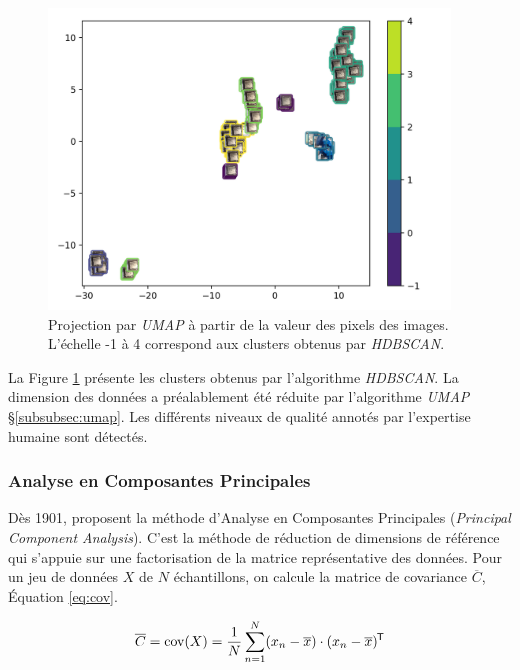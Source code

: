 \begin{figure}[hbtp]
	\centering
	\includegraphics[width=0.95\textwidth,height=\textheight,keepaspectratio]{../Chap4/Figures/visualize_HDBSCAN_clusters_pixel_space.png}
	\caption{Projection par \textit{UMAP} à partir de la valeur des pixels des images. L'échelle -1 à 4 correspond aux clusters obtenus par \textit{HDBSCAN}.}
	\label{fig:hdbscan}
\end{figure}

La Figure \ref{fig:hdbscan} présente les clusters obtenus par l'algorithme \textit{HDBSCAN}.
La dimension des données a préalablement été réduite par l'algorithme \textit{UMAP} §\ref{subsubsec:umap}.
Les différents niveaux de qualité annotés par l'expertise humaine sont détectés.

\subsubsection{Analyse en Composantes Principales} \label{subsubsec:ACP}
Dès 1901, \citeauthor{pearson_lines_1901, hotelling_analysis_1933} \cite{pearson_lines_1901, hotelling_analysis_1933} proposent la méthode d'Analyse en Composantes Principales (\textit{Principal Component Analysis}).
C'est la méthode de réduction de dimensions de référence qui s'appuie sur une factorisation de la matrice représentative des données.
Pour un jeu de données $X$ de $N$ échantillons, on calcule la matrice de covariance $\overline{C}$, Équation \ref{eq:cov}.

\begin{equation} \label{eq:cov}
\overline{C} = \operatorname{cov}(X)=\frac{1}{N} \sum_{n=1}^{N}(x_n-\overline{x}) \cdot (x_n-\overline{x})^{\mkern-1.5mu\mathsf{T}}
\end{equation}

